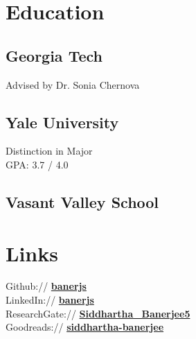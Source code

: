 \documentclass[]{_deedy-resume}
\begin{document}
%
%
\lastupdated

%
%

%
%

\begin{minipage}[t]{0.33\textwidth}


\section{Education}

\subsection{Georgia Tech}
Advised by Dr. Sonia Chernova
\sectionsep

\subsection{Yale University}
Distinction in Major \\
GPA: 3.7 / 4.0
\sectionsep

\subsection{Vasant Valley School}


\section{Links}
Github:// \href{https://github.com/banerjs}{\bf banerjs} \\
LinkedIn://  \href{https://www.linkedin.com/in/banerjs}{\bf banerjs} \\
ResearchGate://  \href{https://www.researchgate.net/profile/Siddhartha\_Banerjee5}{\bf Siddhartha\_Banerjee5} \\
Goodreads:// \href{https://www.goodreads.com/user/show/41408373-siddhartha-banerjee}{\bf siddhartha-banerjee}


\end{minipage}
\end{document}
